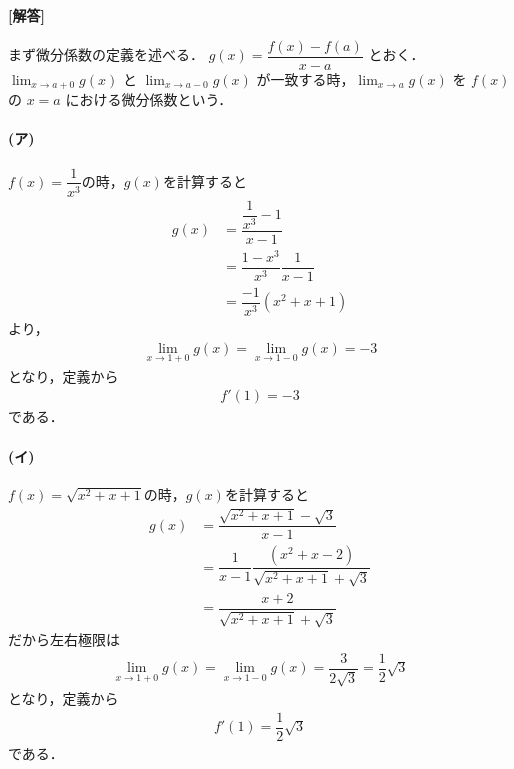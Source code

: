 \documentclass[../../main.tex]{subfiles}
\begin{document}
\begin{oframed}
  
\end{oframed}

{\bf [解答]}

まず微分係数の定義を述べる．
$g(x) = \dfrac{f(x) - f(a)}{x - a}$ とおく．
$\displaystyle \lim_{x \to a+0} g(x)$ と $\displaystyle \lim_{x \to a-0} g(x)$ が一致する時，$\displaystyle \lim_{x \to a} g(x)$ を $f(x)$ の $x = a$ における微分係数という．

\paragraph{(ア)}

$f(x) = \dfrac{1}{x^3}$の時，$g(x)$を計算すると
\begin{align}
  g(x)
  & = \dfrac{\dfrac{1}{x^3} - 1}{x - 1} \\
  & = \dfrac{1 - x^3}{x^3} \dfrac{1}{x - 1} \\
  & = \dfrac{-1}{x^3}(x^2 + x + 1)
\end{align}
より，
\begin{align}
  \lim_{x \to 1+0} g(x) = \lim_{x \to 1-0} g(x) = -3
\end{align}
となり，定義から
\begin{align}
  f'(1) = -3
\end{align}
である．

\paragraph{(イ)}

$f(x) = \sqrt{x^2 + x + 1}$の時，$g(x)$を計算すると
\begin{align}
  g(x)
  & = \dfrac{\sqrt{x^2 + x + 1} - \sqrt{3}}{x - 1} \\
  & = \dfrac{1}{x - 1} \dfrac{(x^2 + x - 2)}{\sqrt{x^2 + x + 1} + \sqrt{3}} \\
  &= \dfrac{x + 2}{\sqrt{x^2 + x + 1} + \sqrt{3}}
\end{align}
だから左右極限は
\begin{align}
  \lim_{x \to 1+0} g(x) = \lim_{x \to 1-0} g(x) = \dfrac{3}{2\sqrt{3}} = \dfrac{1}{2}\sqrt{3}
\end{align}
となり，定義から
\begin{align}
  f'(1) = \dfrac{1}{2}\sqrt{3}
\end{align}
である．

\newpage
\end{document}
